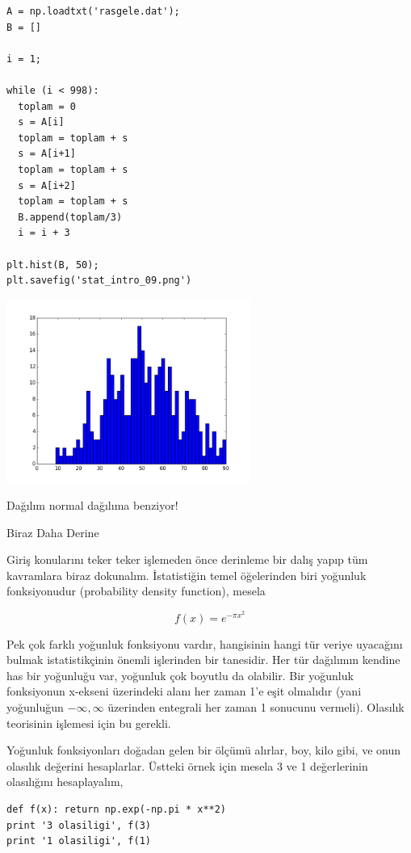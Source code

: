 \documentclass[12pt,fleqn]{article}\usepackage{../../common}
\begin{document}
\begin{verbatim}
A = np.loadtxt('rasgele.dat');
B = []

i = 1;

while (i < 998):
  toplam = 0
  s = A[i]
  toplam = toplam + s
  s = A[i+1]
  toplam = toplam + s
  s = A[i+2]
  toplam = toplam + s
  B.append(toplam/3)
  i = i + 3

plt.hist(B, 50);
plt.savefig('stat_intro_09.png')
\end{verbatim}

\includegraphics[height=6cm]{stat_intro_09.png}

Dağılım normal dağılıma benziyor! 

Biraz Daha Derine

Giriş konularını teker teker işlemeden önce derinleme bir dalış yapıp tüm
kavramlara biraz dokunalım.  İstatistiğin temel öğelerinden biri yoğunluk
fonksiyonudur (probability density function), mesela

$$ f(x) = e^{-\pi x^2} $$

Pek çok farklı yoğunluk fonksiyonu vardır, hangisinin hangi tür veriye
uyacağını bulmak istatistikçinin önemli işlerinden bir tanesidir. Her tür
dağılımın kendine has bir yoğunluğu var, yoğunluk çok boyutlu da
olabilir. Bir yoğunluk fonksiyonun x-ekseni üzerindeki alanı her zaman 1'e
eşit olmalıdır (yani yoğunluğun $-\infty,\infty$ üzerinden entegrali her
zaman 1 sonucunu vermeli). Olasılık teorisinin işlemesi için bu gerekli.

Yoğunluk fonksiyonları doğadan gelen bir ölçümü alırlar, boy, kilo gibi, ve
onun olasılık değerini hesaplarlar. Üstteki örnek için mesela 3 ve 1
değerlerinin olasılığını hesaplayalım,

\begin{verbatim}
def f(x): return np.exp(-np.pi * x**2)
print '3 olasiligi', f(3)
print '1 olasiligi', f(1)
\end{verbatim}
\end{document}
